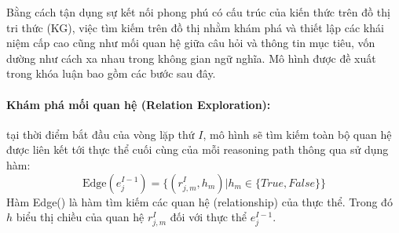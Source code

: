 Bằng cách tận dụng sự kết nối phong phú có cấu trúc của kiến thức trên đồ thị tri thức (KG), việc tìm kiếm trên đồ thị nhằm khám phá và thiết lập các khái niệm cấp cao cũng như mối quan hệ giữa câu hỏi và thông tin mục tiêu, vốn dường như cách xa nhau trong không gian ngữ nghĩa. Mô hình được đề xuất trong khóa luận bao gồm các bước sau đây.
\paragraph{Khám phá mối quan hệ (Relation Exploration):}
tại thời điểm bắt đầu của vòng lặp thứ $I$, mô hình sẽ tìm kiếm toàn bộ quan hệ được liên kết tới thực thể cuối cùng của mỗi reasoning path thông qua sử dụng hàm:
\begin{equation}
    \text{Edge}(e_j^{I-1}) = \{(r_{j, m}^{I}, h_m) | h_m \in \{True, False\}\}
    \label{eq:1}
\end{equation}
Hàm Edge() là hàm tìm kiếm các quan hệ (relationship) của thực thể. Trong đó $h$ biểu thị chiều của quan hệ $r_{j, m}^{I}$ đối với thực thể $e_j^{I-1}$.


